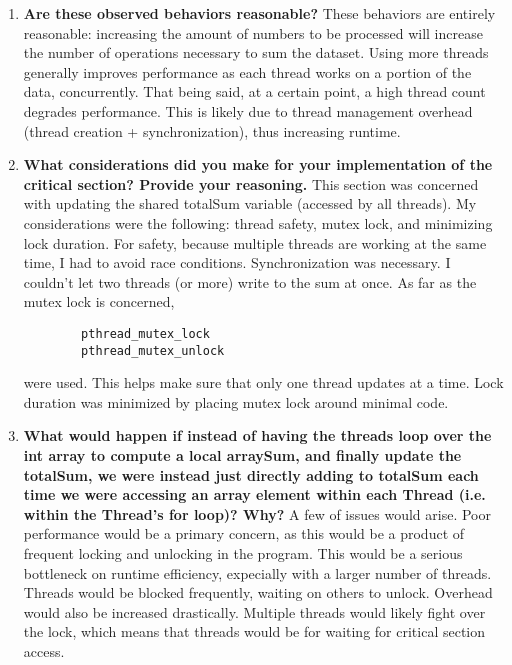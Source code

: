 \documentclass{article}
\begin{document}
\begin{enumerate}
    \item \textbf{Are these observed behaviors reasonable?} These behaviors are entirely reasonable: increasing the amount of numbers to be processed will increase the number of operations necessary to sum the dataset. Using more threads generally improves performance as each thread works on a portion of the data, concurrently. That being said, at a certain point, a high thread count degrades performance. This is likely due to thread management overhead (thread creation + synchronization), thus increasing runtime.
    \item \textbf{What considerations did you make for your implementation of the critical section? Provide your reasoning.} This section was concerned with updating the shared totalSum variable (accessed by all threads). My considerations were the following: thread safety, mutex lock, and minimizing lock duration. For safety, because multiple threads are working at the same time, I had to avoid race conditions. Synchronization was necessary. I couldn't let two threads (or more) write to the sum at once. As far as the mutex lock is concerned, \begin{verbatim}
        pthread_mutex_lock
        pthread_mutex_unlock
    \end{verbatim} were used. This helps make sure that only one thread updates at a time. Lock duration was minimized by placing mutex lock around minimal code.
    \item \textbf{What would happen if instead of having the threads loop over the int array to compute a local arraySum, and finally update the totalSum, we were instead just directly adding to totalSum each time we were accessing an array element within each Thread (i.e. within the Thread's for loop)? Why?} A few of issues would arise. Poor performance would be a primary concern, as this would be a product of frequent locking and unlocking in the program. This would be a serious bottleneck on runtime efficiency, expecially with a larger number of threads. Threads would be blocked frequently, waiting on others to unlock. Overhead would also be increased drastically. Multiple threads would likely fight over the lock, which means that threads would be for waiting for critical section access.
\end{enumerate}
\end{document}
